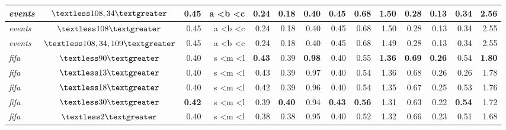 \documentclass[runningheads,a4paper]{llncs}
\begin{document}
\begin{table}
\begin{tabularx}{\textwidth}{l@{}c@{}R@{}R@{}R@{}R@{}R@{}R@{}R@{}R@{}R@{}R@{}R@{}R@{}}
        \midrule
    \textit{events}   & $\textless 108,34\textgreater$ & 0.45 & a \textless b \textless c & 0.24 & 0.18 & 0.40 & 0.45 & 0.68 & 1.50 & \textbf{0.28} & 0.13 & 0.34 & 2.56 \\
        \midrule
    \textit{events}   & $\textless 108\textgreater$  & 0.45 & a \textless b \textless c & 0.24 & 0.18 & 0.40 & 0.45 & 0.68 & 1.50 & 0.28 & 0.13 & 0.34 & 2.55 \\
        \midrule
    \textit{events}   & $\textless 108,34,109\textgreater$ & 0.45 & a \textless b \textless c & 0.24 & 0.18 & 0.40 & 0.45 & 0.68 & 1.49 & 0.28 & 0.13 & 0.34 & 2.55 \\
	    \midrule
	    \midrule
	\textit{fifa} & $\textless 90\textgreater$ & 0.40 & s \textless m \textless l & \textbf{0.43} & 0.39 & \textbf{0.98} & 0.40 & 0.55 & \textbf{1.36} & \textbf{0.69} & \textbf{0.26} & 0.54 & \textbf{1.80} \\
	    \midrule
    	\textit{fifa} & $\textless 13\textgreater$ & 0.40 & s \textless m \textless l & 0.43 & 0.39 & 0.97 & 0.40 & 0.54 & 1.36 & 0.68 & 0.26 & 0.26 & 1.78 \\
    	    \midrule
    \textit{fifa} & $\textless 18\textgreater$ & 0.40 & s \textless m \textless l & 0.42 & 0.39 & 0.96 & 0.40 & 0.54 & 1.35 & 0.67 & 0.25 & 0.53 & 1.76 \\
        \midrule
    \textit{fifa} & $\textless 30\textgreater$ & \textbf{0.42} & s \textless m \textless l & 0.39 & \textbf{0.40} & 0.94 & \textbf{0.43} & \textbf{0.56} & 1.31 & 0.63 & 0.22 & \textbf{0.54} & 1.72 \\
        \midrule
    \textit{fifa} & $\textless 2\textgreater$ & 0.40 & s \textless m \textless l & 0.38 & 0.38 & 0.95 & 0.40 & 0.52 & 1.32 & 0.66 & 0.23 & 0.51 & 1.68 \\
        \bottomrule
    \end{tabularx}%
  \label{tab:results}%
\end{table}%
\end{document}
